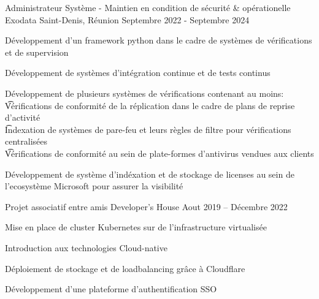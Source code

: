 
\begin{cventries}
  \cventry
    {Administrateur Système - Maintien en condition de sécurité \& opérationelle}
    {Exodata}
    {Saint-Denis, Réunion}
    {Septembre 2022 - Septembre 2024}
    {
      \begin{cvitems}
       \item{Développement d'un framework python dans le cadre de systèmes de vérifications et de supervision}
       \item{Développement de systèmes d'intégration continue et de tests continus}
       \item{
        Développement de plusieurs systèmes de vérifications contenant au moins: \\
        \t  * Vérifications de conformité de la réplication dans le cadre de plans de reprise d'activité \\
        \t  * Indexation de systèmes de pare-feu et leurs règles de filtre pour vérifications centralisées \\
        \t  * Vérifications de conformité au sein de plate-formes d'antivirus vendues aux clients
        }
        \item{Développement de système d'indéxation et de stockage de licenses au sein de l'ecosystème Microsoft pour assurer la visibilité}
      \end{cvitems}
    }
  \cventry
    {Projet associatif entre amis}
    {Developer's House}
    {}
    {Aout 2019 -- Décembre 2022}
    {
    \begin{cvitems}
      \item{Mise en place de cluster Kubernetes sur de l'infrastructure virtualisée}
      \item{Introduction aux technologies Cloud-native}
      \item{Déploiement de stockage et de loadbalancing grâce à Cloudflare}
      \item{Développement d'une plateforme d'authentification SSO}
    \end{cvitems}
    }
    
\end{cventries}
